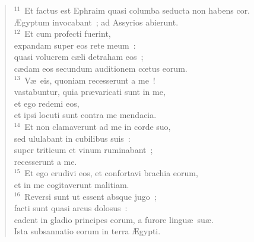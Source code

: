 \begin{verse}
${}^{11}$~Et factus est Ephraim quasi columba seducta non habens cor.\\ \AE gyptum invocabant~; ad Assyrios abierunt.\\
${}^{12}$~Et cum profecti fuerint,\\ expandam super eos rete meum~:\\ quasi volucrem c\ae li detraham eos~;\\ c\ae dam eos secundum auditionem cœtus eorum.\\
${}^{13}$~V\ae\ eis, quoniam recesserunt a me~!\\ vastabuntur, quia pr\ae varicati sunt in me,\\ et ego redemi eos,\\ et ipsi locuti sunt contra me mendacia.\\
${}^{14}$~Et non clamaverunt ad me in corde suo,\\ sed ululabant in cubilibus suis~:\\ super triticum et vinum ruminabant~;\\ recesserunt a me.\\
${}^{15}$~Et ego erudivi eos, et confortavi brachia eorum,\\ et in me cogitaverunt malitiam.\\
${}^{16}$~Reversi sunt ut essent absque jugo~;\\ facti sunt quasi arcus dolosus~:\\ cadent in gladio principes eorum, a furore lingu\ae\ su\ae .\\ Ista subsannatio eorum in terra \AE gypti.\end{verse}


